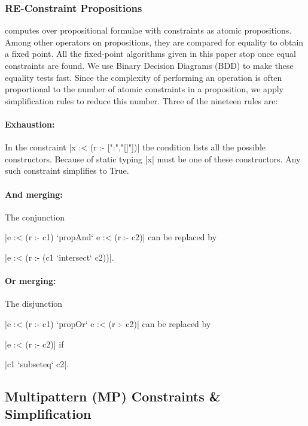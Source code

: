 \subsubsection{RE-Constraint Propositions}
\label{sec:re-propositions}

\catch{} computes over propositional formulae with constraints as atomic propositions. Among other operators on propositions, they are compared for equality to obtain a fixed point. All the fixed-point algorithms given in this paper stop once equal constraints are found. We use Binary Decision Diagrams (BDD) \citep{lee:bdd} to make these equality tests fast. Since the complexity of performing an operation is often proportional to the number of atomic constraints in a proposition, we apply simplification rules to reduce this number. Three of the nineteen rules are:

\paragraph{Exhaustion:} In the constraint |x :< (r :- [":","[]"])| the condition lists all the possible constructors. Because of static typing |x| must be one of these constructors. Any such constraint simplifies to True.

\paragraph{And merging:} The conjunction \ignore|e :< (r :- c1) `propAnd` e :< (r :- c2)| can be replaced by \ignore|e :< (r :- (c1 `intersect` c2))|.

\paragraph{Or merging:} The disjunction \ignore|e :< (r :- c1) `propOr` e :< (r :- c2)| can be replaced by \ignore|e :< (r :- c2)| if \ignore|c1 `subseteq` c2|.


\subsection{Multipattern (MP) Constraints \& Simplification}
\label{sec:multipattern}

